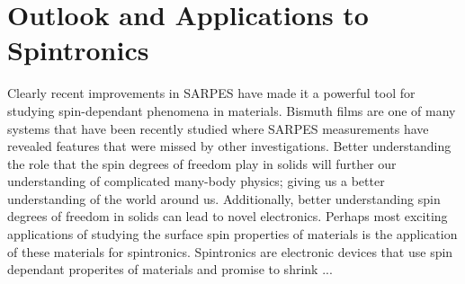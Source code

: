 \documentclass[12pt]{article}
\begin{document}
\section{Outlook and Applications to Spintronics}
Clearly recent improvements in SARPES have made it a powerful tool for studying spin-dependant phenomena in materials.
Bismuth films are one of many systems that have been recently studied where SARPES measurements have revealed features that were missed by other investigations.
Better understanding the role that the spin degrees of freedom play in solids will further our understanding of complicated many-body physics; giving us a better understanding of the world around us.
Additionally, better understanding spin degrees of freedom in solids can lead to novel electronics.
Perhaps most exciting applications of studying the surface spin properties of materials is the application of these materials for spintronics.
Spintronics are electronic devices that use spin dependant properites of materials and promise to shrink ...

\printbibliography
\end{document}
